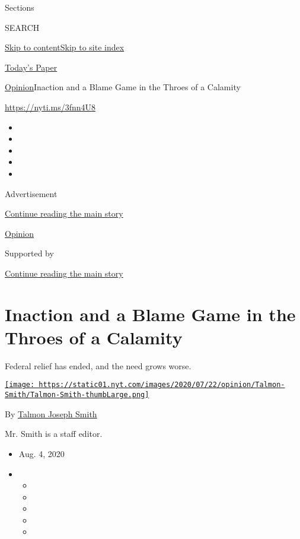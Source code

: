 Sections

SEARCH

\protect\hyperlink{site-content}{Skip to
content}\protect\hyperlink{site-index}{Skip to site index}

\href{https://myaccount.nytimes.com/auth/login?response_type=cookie\&client_id=vi}{}

\href{https://www.nytimes.com/section/todayspaper}{Today's Paper}

\href{/section/opinion}{Opinion}\textbar{}Inaction and a Blame Game in
the Throes of a Calamity

\url{https://nyti.ms/3fnn4U8}

\begin{itemize}
\item
\item
\item
\item
\item
\end{itemize}

Advertisement

\protect\hyperlink{after-top}{Continue reading the main story}

\href{/section/opinion}{Opinion}

Supported by

\protect\hyperlink{after-sponsor}{Continue reading the main story}

\hypertarget{inaction-and-a-blame-game-in-the-throes-of-a-calamity}{%
\section{Inaction and a Blame Game in the Throes of a
Calamity}\label{inaction-and-a-blame-game-in-the-throes-of-a-calamity}}

Federal relief has ended, and the need grows worse.

\href{https://www.nytimes.com/by/talmon-joseph-smith}{\texttt{[image: https://static01.nyt.com/images/2020/07/22/opinion/Talmon-Smith/Talmon-Smith-thumbLarge.png]}}

By \href{https://www.nytimes.com/by/talmon-joseph-smith}{Talmon Joseph
Smith}

Mr. Smith is a staff editor.

\begin{itemize}
\item
  Aug. 4, 2020
\item
  \begin{itemize}
  \item
  \item
  \item
  \item
  \item
  \end{itemize}
\end{itemize}

